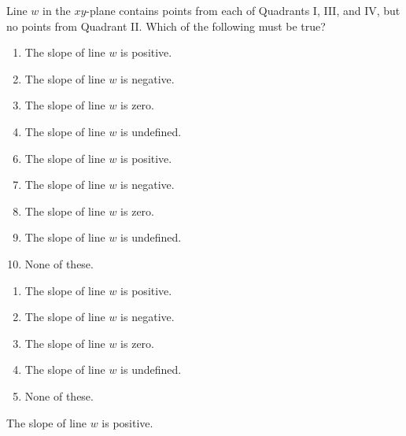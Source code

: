  
Line $w$ in the $xy$-plane contains points from each of Quadrants I, III, and IV, but no points from Quadrant II.  Which of the following must be true?


\ifsat
	\begin{enumerate}[label=\Alph*)]
		\item The slope of line $w $ is positive. %
		\item The slope of line $w $ is negative.
		\item The slope of line $w $ is zero.
		\item The slope of line $w $ is undefined.
	\end{enumerate}
\else
\fi

\ifacteven
	\begin{enumerate}[label=\textbf{\Alph*.},itemsep=\fill,align=left]
		\setcounter{enumii}{5}
		\item The slope of line $w $ is positive. %
		\item The slope of line $w $ is negative.
		\item The slope of line $w $ is zero.
		\addtocounter{enumii}{1}
		\item The slope of line $w $ is undefined.
		\item None of these. 
	\end{enumerate}
\else
\fi

\ifactodd
	\begin{enumerate}[label=\textbf{\Alph*.},itemsep=\fill,align=left]
		\item The slope of line $w $ is positive. %
		\item The slope of line $w $ is negative.
		\item The slope of line $w $ is zero.
		\item The slope of line $w $ is undefined.
		\item None of these. 
	\end{enumerate}
\else
\fi

\ifgridin
 The slope of line $w $ is positive. %
		
\else
\fi

